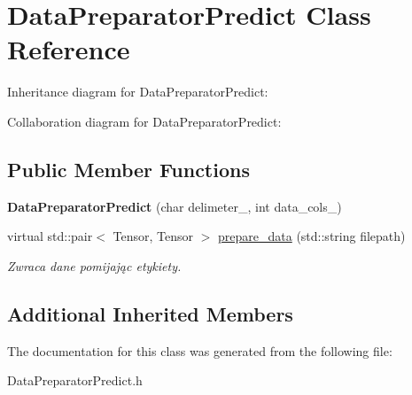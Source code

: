 \hypertarget{classDataPreparatorPredict}{}\section{Data\+Preparator\+Predict Class Reference}
\label{classDataPreparatorPredict}


Inheritance diagram for Data\+Preparator\+Predict\+:


Collaboration diagram for Data\+Preparator\+Predict\+:
\subsection*{Public Member Functions}
\begin{DoxyCompactItemize}
\item 
\mbox{\label{classDataPreparatorPredict_af1e3150bedc51b7a28da49609aabb88a}} 
{\bfseries Data\+Preparator\+Predict} (char delimeter\+\_\+, int data\+\_\+cols\+\_\+)
\item 
\mbox{\label{classDataPreparatorPredict_a5251908aa2bbd5eabbac364444264f70}} 
virtual std\+::pair$<$ Tensor, Tensor $>$ \hyperlink{classDataPreparatorPredict_a5251908aa2bbd5eabbac364444264f70}{prepare\+\_\+data} (std\+::string filepath)
\begin{DoxyCompactList}\small\item\em Zwraca dane pomijając etykiety. \end{DoxyCompactList}\end{DoxyCompactItemize}
\subsection*{Additional Inherited Members}


The documentation for this class was generated from the following file\+:\begin{DoxyCompactItemize}
\item 
Data\+Preparator\+Predict.\+h\end{DoxyCompactItemize}
